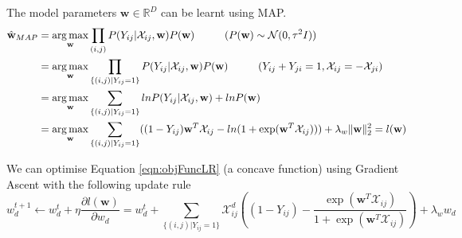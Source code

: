 The model parameters $\textbf{w} \in \mathbb{R}^D$ can be learnt using MAP.
\begin{align}
	\label{eqn:objFuncLR}
	\hat{\textbf{w}}_{MAP} &= \operatorname*{arg\,max}_{\textbf{w}} \prod_{(i,j)} P(Y_{ij}| \mathcal{X}_{ij}, \textbf{w}) P(\textbf{w}) \hspace{1 cm} \text{($P(\textbf{w}) \sim \mathcal{N} (0, \tau^2 I) $)}\\ \notag
	&= \operatorname*{arg\,max}_{\textbf{w}} \prod_{\{(i,j)|Y_{ij}=1\}} P(Y_{ij}| \mathcal{X}_{ij}, \textbf{w}) P(\textbf{w}) \hspace{1 cm} \text{($Y_{ij} + Y_{ji} = 1, \mathcal{X}_{ij} = - \mathcal{X}_{ji}$)}\\ \notag
	&= \operatorname*{arg\,max}_{\textbf{w}} \sum_{\{(i,j)|Y_{ij}=1\}} ln P(Y_{ij}| \mathcal{X}_{ij}, \textbf{w}) + ln P(\textbf{w}) \\ \notag
	&= \operatorname*{arg\,max}_{\textbf{w}} \sum_{\{(i,j)|Y_{ij}=1\}} ( (1 - Y_{ij})\textbf{w}^T\mathcal{X}_{ij} - ln(1 + \exp(\textbf{w}^T\mathcal{X}_{ij}))) + \lambda_w \|\textbf{w} \|^2_2 = l(\textbf{w})
\end{align}

We can optimise Equation \ref{eqn:objFuncLR} (a concave function) using Gradient Ascent with the following update rule
\begin{equation}
w^{t+1}_d \leftarrow w^t_d + \eta \frac{\partial l(\textbf{w})}{\partial w_d} = w^t_d + \sum_{\{(i,j)|Y_{ij}=1\}} \mathcal{X}_{ij}^d ( (1 - Y_{ij}) - \frac{\exp(\textbf{w}^T\mathcal{X}_{ij})}{1 + \exp(\textbf{w}^T\mathcal{X}_{ij})})  + \lambda_w w_d
\end{equation}
